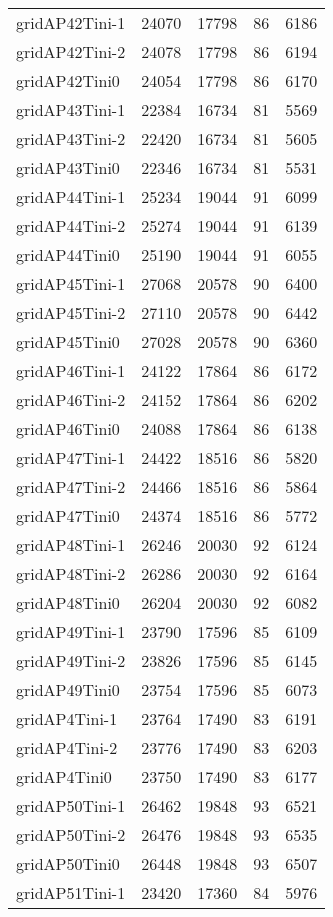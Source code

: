 \begin{tabular}{lrrrr}
gridAP42Tini-1 & 24070 & 17798 & 86 & 6186 \\
gridAP42Tini-2 & 24078 & 17798 & 86 & 6194 \\
gridAP42Tini0 & 24054 & 17798 & 86 & 6170 \\
gridAP43Tini-1 & 22384 & 16734 & 81 & 5569 \\
gridAP43Tini-2 & 22420 & 16734 & 81 & 5605 \\
gridAP43Tini0 & 22346 & 16734 & 81 & 5531 \\
gridAP44Tini-1 & 25234 & 19044 & 91 & 6099 \\
gridAP44Tini-2 & 25274 & 19044 & 91 & 6139 \\
gridAP44Tini0 & 25190 & 19044 & 91 & 6055 \\
gridAP45Tini-1 & 27068 & 20578 & 90 & 6400 \\
gridAP45Tini-2 & 27110 & 20578 & 90 & 6442 \\
gridAP45Tini0 & 27028 & 20578 & 90 & 6360 \\
gridAP46Tini-1 & 24122 & 17864 & 86 & 6172 \\
gridAP46Tini-2 & 24152 & 17864 & 86 & 6202 \\
gridAP46Tini0 & 24088 & 17864 & 86 & 6138 \\
gridAP47Tini-1 & 24422 & 18516 & 86 & 5820 \\
gridAP47Tini-2 & 24466 & 18516 & 86 & 5864 \\
gridAP47Tini0 & 24374 & 18516 & 86 & 5772 \\
gridAP48Tini-1 & 26246 & 20030 & 92 & 6124 \\
gridAP48Tini-2 & 26286 & 20030 & 92 & 6164 \\
gridAP48Tini0 & 26204 & 20030 & 92 & 6082 \\
gridAP49Tini-1 & 23790 & 17596 & 85 & 6109 \\
gridAP49Tini-2 & 23826 & 17596 & 85 & 6145 \\
gridAP49Tini0 & 23754 & 17596 & 85 & 6073 \\
gridAP4Tini-1 & 23764 & 17490 & 83 & 6191 \\
gridAP4Tini-2 & 23776 & 17490 & 83 & 6203 \\
gridAP4Tini0 & 23750 & 17490 & 83 & 6177 \\
gridAP50Tini-1 & 26462 & 19848 & 93 & 6521 \\
gridAP50Tini-2 & 26476 & 19848 & 93 & 6535 \\
gridAP50Tini0 & 26448 & 19848 & 93 & 6507 \\
gridAP51Tini-1 & 23420 & 17360 & 84 & 5976 \\

\end{tabular}
